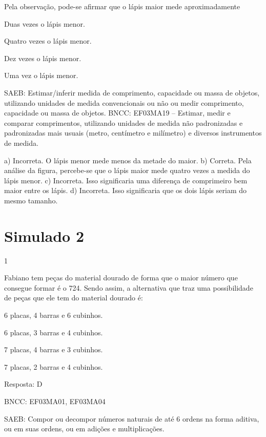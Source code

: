 \begin{escolha}
{\begin{escolha}
{Pela observação, pode-se afirmar que o lápis maior mede aproximadamente

\begin{escolha}
\item
  Duas vezes o lápis menor.
\item
  Quatro vezes o lápis menor.
\item
  Dez vezes o lápis menor.
\item
  Uma vez o lápis menor.
\end{escolha}

SAEB: Estimar/inferir medida de comprimento, capacidade ou
massa de objetos, utilizando unidades de medida convencionais ou não ou
medir comprimento, capacidade ou massa de objetos.
BNCC: EF03MA19 -- Estimar, medir e comparar comprimentos, utilizando unidades de medida
não padronizadas e padronizadas mais usuais (metro, centímetro e milímetro) e diversos
instrumentos de medida.

a) Incorreta. O lápis menor mede menos da metade do maior.
b) Correta. Pela análise da figura, percebe-se que o lápis maior mede quatro vezes a medida do lápis menor.
c) Incorreta. Isso significaria uma diferença de comprimeiro bem maior entre os lápis.
d) Incorreta. Isso significaria que os dois lápis seriam do mesmo tamanho.

\chapter{Simulado 2}

\num{1}

Fabiano tem peças do material dourado de forma que o maior número
que consegue formar é o 724. Sendo assim, a alternativa que traz uma
possibilidade de peças que ele tem do material dourado é:

\begin{escolha}
\item
  6 placas, 4 barras e 6 cubinhos.
\item
  6 placas, 3 barras e 4 cubinhos.
\item
  7 placas, 4 barras e 3 cubinhos.
\item
  7 placas, 2 barras e 4 cubinhos.
\end{escolha}

Resposta: D

BNCC: EF03MA01, EF03MA04

SAEB: Compor ou decompor números naturais de até 6 ordens na
forma aditiva, ou em suas ordens, ou em adições e multiplicações.

}
\end{escolha}}
\end{escolha}
